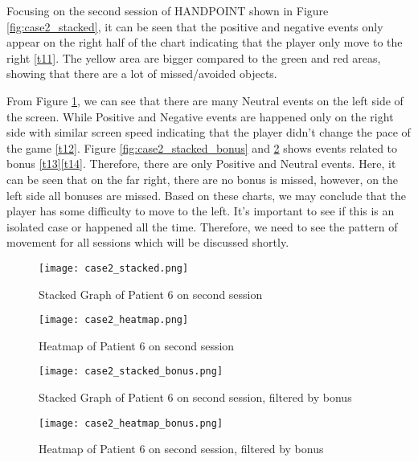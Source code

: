 Focusing on the second session of HANDPOINT shown in Figure \ref{fig:case2_stacked}, it can be seen that the positive and negative events only appear on the right half of the chart indicating that the player only move to the right \ref{t11}. The yellow area are bigger compared to the green and red areas, showing that there are a lot of missed/avoided objects. 

From Figure \ref{fig:case2_heatmap}, we can see that there are many Neutral events on the left side of the screen. While Positive and Negative events are happened only on the right side with similar screen speed indicating that the player didn't change the pace of the game \ref{t12}. Figure \ref{fig:case2_stacked_bonus} and \ref{fig:case2_heatmap_bonus} shows events related to bonus \ref{t13}\ref{t14}. Therefore, there are only Positive and Neutral events. Here, it can be seen that on the far right, there are no bonus is missed, however, on the left side all bonuses are missed. Based on these charts, we may conclude that the player has some difficulty to move to the left. It's important to see if this is an isolated case or happened all the time. Therefore, we need to see the pattern of movement for all sessions which will be discussed shortly.
\begin{figure}[H]
\centering
\texttt{[image: case2\_stacked.png]}
\caption{Stacked Graph of Patient 6 on second session}
\label{fig:case2_stacked}
\vspace{1cm}
\texttt{[image: case2\_heatmap.png]}
\caption{Heatmap of Patient 6 on second session}
\label{fig:case2_heatmap}
\end{figure}

\begin{figure}[H]
\centering
\texttt{[image: case2\_stacked\_bonus.png]}
\caption{Stacked Graph of Patient 6 on second session, filtered by bonus}
\label{fig:case2_stacked_bonus}
\vspace{1cm}
\texttt{[image: case2\_heatmap\_bonus.png]}
\caption{Heatmap of Patient 6 on second session, filtered by bonus}
\label{fig:case2_heatmap_bonus}
\end{figure}

